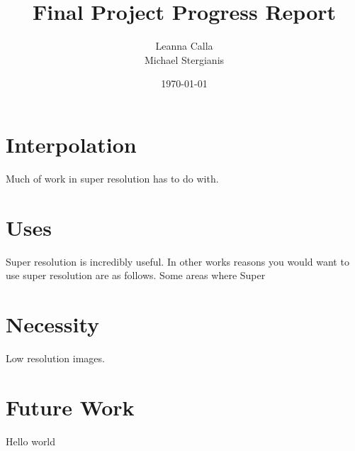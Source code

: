\documentclass{article}
\title{Final Project Progress Report}
\author{Leanna Calla\\Michael Stergianis}
\date{\today}
\begin{document}
\maketitle
\section{Interpolation}
\label{sec:interpolation}
Much of work in super resolution has to do with. 
%
%
\section{Uses}
\label{sec:uses}
Super resolution is incredibly useful. In other works \cite{Yang2010ImageSH} reasons you
would want to use super resolution are as follows. Some areas where
Super 
%
%
\section{Necessity}
\label{sec:necessity}
Low resolution images.
%
%
\section{Future Work}
\label{sec:future}
Hello world
%
\printbibliography
\end{document}
